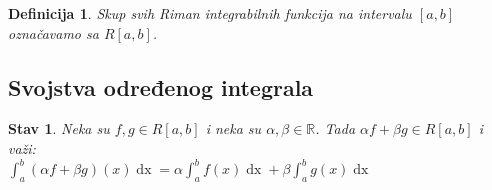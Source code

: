 \documentclass{article}
\newtheorem{definicija}{Definicija}[section]
\newtheorem{stav}{Stav}[section]
\DeclareMathOperator{\dx}{dx}
\begin{document}
\begin{defbox}
    \label{definicija_2.9}
    \begin{definicija}
        Skup svih Riman integrabilnih funkcija na intervalu $\left[a,b\right]$ označavamo sa $R\left[a, b\right]$.
    \end{definicija}
\end{defbox}

\subsection{Svojstva određenog integrala}

\begin{stavbox}
    \label{stav_2.4}
    \begin{stav}
        Neka su $f, g \in R\left[a, b\right]$ i neka su $\alpha, \beta \in \mathbb{R}$. Tada
        $\alpha f +\beta g \in R\left[a, b\right]$ i važi:\\
        $\displaystyle \int^b_a\left(\alpha f + \beta g\right)\left(x\right)\dx = \alpha\int^b_af\left(x\right)\dx + \beta\int^b_ag\left(x\right)\dx$
    \end{stav}
\end{stavbox}
\end{document}
